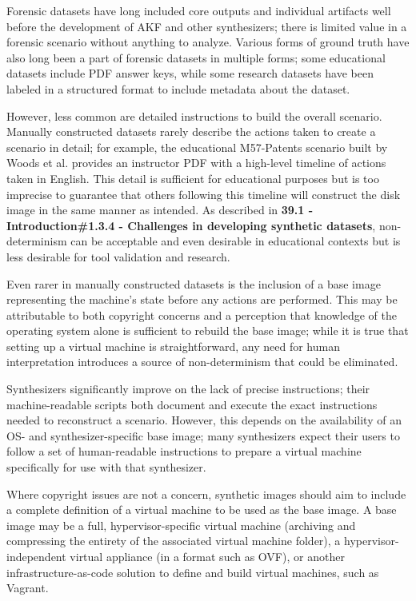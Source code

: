Forensic datasets have long included core outputs and individual
artifacts well before the development of AKF and other synthesizers;
there is limited value in a forensic scenario without anything to
analyze. Various forms of ground truth have also long been a part of
forensic datasets in multiple forms; some educational datasets include
PDF answer keys, while some research datasets have been labeled in a
structured format to include metadata about the dataset.

However, less common are detailed instructions to build the overall
scenario. Manually constructed datasets rarely describe the actions
taken to create a scenario in detail; for example, the educational
M57-Patents scenario built by Woods et al.
\cite{woodsCreatingRealisticCorpora2011} provides an instructor PDF
with a high-level timeline of actions taken in English. This detail is
sufficient for educational purposes but is too imprecise to guarantee
that others following this timeline will construct the disk image in the
same manner as intended. As described in \textbf{39.1 -
Introduction\#1.3.4 - Challenges in developing synthetic datasets},
non-determinism can be acceptable and even desirable in educational
contexts but is less desirable for tool validation and research.

Even rarer in manually constructed datasets is the inclusion of a base
image representing the machine's state before any actions are performed.
This may be attributable to both copyright concerns and a perception
that knowledge of the operating system alone is sufficient to rebuild
the base image; while it is true that setting up a virtual machine is
straightforward, any need for human interpretation introduces a source
of non-determinism that could be eliminated.

Synthesizers significantly improve on the lack of precise instructions;
their machine-readable scripts both document and execute the exact
instructions needed to reconstruct a scenario. However, this depends on
the availability of an OS- and synthesizer-specific base image; many
synthesizers expect their users to follow a set of human-readable
instructions to prepare a virtual machine specifically for use with that
synthesizer.

Where copyright issues are not a concern, synthetic images should aim to
include a complete definition of a virtual machine to be used as the
base image. A base image may be a full, hypervisor-specific virtual
machine (archiving and compressing the entirety of the associated
virtual machine folder), a hypervisor-independent virtual appliance (in
a format such as OVF), or another infrastructure-as-code solution to
define and build virtual machines, such as Vagrant.

